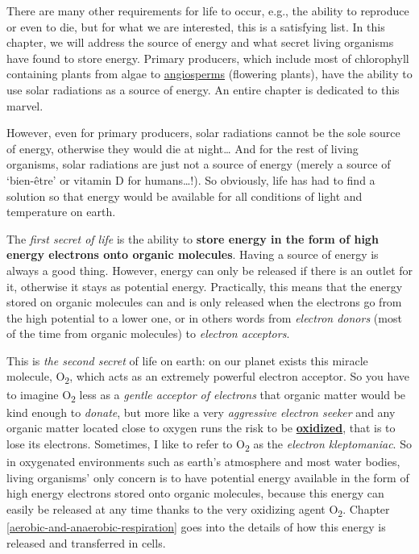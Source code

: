 \documentclass[]{book}
\theoremstyle{definition}
\theoremstyle{definition}
\theoremstyle{definition}
\theoremstyle{remark}
\begin{document}
There are many other requirements for life to occur, e.g., the ability
to reproduce or even to die, but for what we are interested, this is a
satisfying list. In this chapter, we will address the source of energy
and what secret living organisms have found to store energy. Primary
producers, which include most of chlorophyll containing plants from
algae to
\href{https://en.wikipedia.org/wiki/Flowering_plant}{angiosperms}
(flowering plants), have the ability to use solar radiations as a source
of energy. An entire chapter is dedicated to this marvel.

However, even for primary producers, solar radiations cannot be the sole
source of energy, otherwise they would die at night\ldots{} And for the
rest of living organisms, solar radiations are just not a source of
energy (merely a source of `bien-être' or vitamin D for
humans\ldots{}!). So obviously, life has had to find a solution so that
energy would be available for all conditions of light and temperature on
earth.

The \emph{first secret of life} is the ability to \textbf{store energy
in the form of high energy electrons onto organic molecules}. Having a
source of energy is always a good thing. However, energy can only be
released if there is an outlet for it, otherwise it stays as potential
energy. Practically, this means that the energy stored on organic
molecules can and is only released when the electrons go from the high
potential to a lower one, or in others words from \emph{electron donors}
(most of the time from organic molecules) to \emph{electron acceptors}.

This is \emph{the second secret} of life on earth: on our planet exists
this miracle molecule, O\textsubscript{2}, which acts as an extremely
powerful electron acceptor. So you have to imagine O\textsubscript{2}
less as a \emph{gentle acceptor of electrons} that organic matter would
be kind enough to \emph{donate}, but more like a very \emph{aggressive
electron seeker} and any organic matter located close to oxygen runs the
risk to be \textbf{\protect\hyperlink{oxidation}{oxidized}}, that is to
lose its electrons. Sometimes, I like to refer to O\textsubscript{2} as
the \emph{electron kleptomaniac}. So in oxygenated environments such as
earth's atmosphere and most water bodies, living organisms' only concern
is to have potential energy available in the form of high energy
electrons stored onto organic molecules, because this energy can easily
be released at any time thanks to the very oxidizing agent
O\textsubscript{2}. Chapter \ref{aerobic-and-anaerobic-respiration} goes
into the details of how this energy is released and transferred in
cells.
\end{document}
